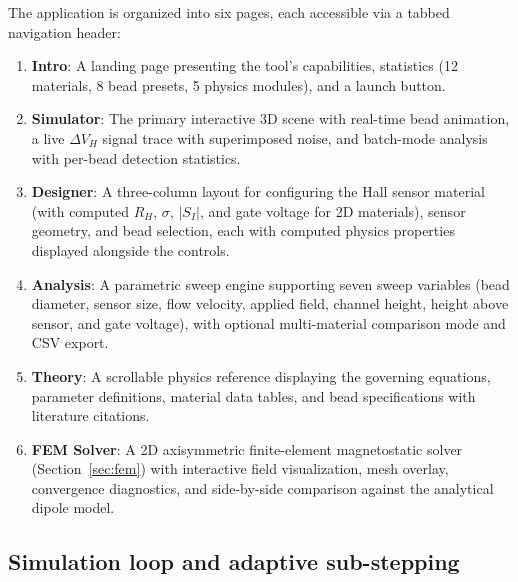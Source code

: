 \documentclass[preprint,review,12pt]{elsarticle}
\begin{document}
The application is organized into six pages, each accessible via a tabbed navigation header:

\begin{enumerate}[nosep]
\item \textbf{Intro}: A landing page presenting the tool's capabilities, statistics (12 materials, 8 bead presets, 5 physics modules), and a launch button.
\item \textbf{Simulator}: The primary interactive 3D scene with real-time bead animation, a live $\Delta V_H$ signal trace with superimposed noise, and batch-mode analysis with per-bead detection statistics.
\item \textbf{Designer}: A three-column layout for configuring the Hall sensor material (with computed $R_H$, $\sigma$, $|S_I|$, and gate voltage for 2D materials), sensor geometry, and bead selection, each with computed physics properties displayed alongside the controls.
\item \textbf{Analysis}: A parametric sweep engine supporting seven sweep variables (bead diameter, sensor size, flow velocity, applied field, channel height, height above sensor, and gate voltage), with optional multi-material comparison mode and CSV export.
\item \textbf{Theory}: A scrollable physics reference displaying the governing equations, parameter definitions, material data tables, and bead specifications with literature citations.
\item \textbf{FEM Solver}: A 2D axisymmetric finite-element magnetostatic solver (Section~\ref{sec:fem}) with interactive field visualization, mesh overlay, convergence diagnostics, and side-by-side comparison against the analytical dipole model.
\end{enumerate}

\subsection{Simulation loop and adaptive sub-stepping}
\label{sec:simloop}
\end{document}
